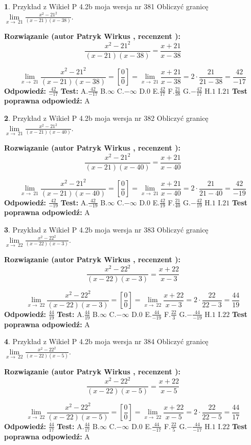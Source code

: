 \documentclass[12pt, a4paper]{article}
\theoremstyle{definition} %
\newtheorem{zad}{}
\newcommand{\zadStart}[1]{\begin{zad}#1\newline}
\newcommand{\zadStop}{\end{zad}}
\newcommand{\rozwStart}[2]{\noindent \textbf{Rozwiązanie (autor #1 , recenzent #2): }\newline}
\newcommand{\rozwStop}{\newline}
\newcommand{\odpStart}{\noindent \textbf{Odpowiedź:}\newline}
\newcommand{\odpStop}{\newline}
\newcommand{\testStart}{\noindent \textbf{Test:}\newline}
\newcommand{\testStop}{\newline}
\newcommand{\kluczStart}{\noindent \textbf{Test poprawna odpowiedź:}\newline}
\newcommand{\kluczStop}{\newline}
\begin{document}
\zadStart{Przykład z Wikieł P 4.2b moja wersja nr 381}
Obliczyć granicę $\lim\limits_{x\to\ 21}\frac{x^{2}-21^{2}}{(x-21)(x-38)}$.
\zadStop
\rozwStart{Patryk Wirkus}{}
$$\frac{x^{2}-21^{2}}{(x-21)(x-38)}=\frac{x+21}{x-38}$$

$$\lim\limits_{x\to\ 21}\frac{x^{2}-21^{2}}{(x-21)(x-38)}=[\frac{0}{0}]=\lim\limits_{x\to\ 21}\frac{x+21}{x-38}=2 \cdot \frac{21}{21-38} = \frac{42}{-17}$$
\rozwStop
\odpStart
$\frac{42}{-17}$
\odpStop
\testStart
A.$\frac{42}{-17}$
B.$\infty$
C.$-\infty$
D.$0$
E.$\frac{42}{17}$
F.$\frac{21}{38}$
G.$-\frac{42}{17}$
H.$1$
I.$21$
\testStop
\kluczStart
A
\kluczStop



\zadStart{Przykład z Wikieł P 4.2b moja wersja nr 382}
Obliczyć granicę $\lim\limits_{x\to\ 21}\frac{x^{2}-21^{2}}{(x-21)(x-40)}$.
\zadStop
\rozwStart{Patryk Wirkus}{}
$$\frac{x^{2}-21^{2}}{(x-21)(x-40)}=\frac{x+21}{x-40}$$

$$\lim\limits_{x\to\ 21}\frac{x^{2}-21^{2}}{(x-21)(x-40)}=[\frac{0}{0}]=\lim\limits_{x\to\ 21}\frac{x+21}{x-40}=2 \cdot \frac{21}{21-40} = \frac{42}{-19}$$
\rozwStop
\odpStart
$\frac{42}{-19}$
\odpStop
\testStart
A.$\frac{42}{-19}$
B.$\infty$
C.$-\infty$
D.$0$
E.$\frac{42}{19}$
F.$\frac{21}{40}$
G.$-\frac{42}{19}$
H.$1$
I.$21$
\testStop
\kluczStart
A
\kluczStop



\zadStart{Przykład z Wikieł P 4.2b moja wersja nr 383}
Obliczyć granicę $\lim\limits_{x\to\ 22}\frac{x^{2}-22^{2}}{(x-22)(x-3)}$.
\zadStop
\rozwStart{Patryk Wirkus}{}
$$\frac{x^{2}-22^{2}}{(x-22)(x-3)}=\frac{x+22}{x-3}$$

$$\lim\limits_{x\to\ 22}\frac{x^{2}-22^{2}}{(x-22)(x-3)}=[\frac{0}{0}]=\lim\limits_{x\to\ 22}\frac{x+22}{x-3}=2 \cdot \frac{22}{22-3} = \frac{44}{19}$$
\rozwStop
\odpStart
$\frac{44}{19}$
\odpStop
\testStart
A.$\frac{44}{19}$
B.$\infty$
C.$-\infty$
D.$0$
E.$\frac{44}{-19}$
F.$\frac{22}{3}$
G.$-\frac{44}{-19}$
H.$1$
I.$22$
\testStop
\kluczStart
A
\kluczStop



\zadStart{Przykład z Wikieł P 4.2b moja wersja nr 384}
Obliczyć granicę $\lim\limits_{x\to\ 22}\frac{x^{2}-22^{2}}{(x-22)(x-5)}$.
\zadStop
\rozwStart{Patryk Wirkus}{}
$$\frac{x^{2}-22^{2}}{(x-22)(x-5)}=\frac{x+22}{x-5}$$

$$\lim\limits_{x\to\ 22}\frac{x^{2}-22^{2}}{(x-22)(x-5)}=[\frac{0}{0}]=\lim\limits_{x\to\ 22}\frac{x+22}{x-5}=2 \cdot \frac{22}{22-5} = \frac{44}{17}$$
\rozwStop
\odpStart
$\frac{44}{17}$
\odpStop
\testStart
A.$\frac{44}{17}$
B.$\infty$
C.$-\infty$
D.$0$
E.$\frac{44}{-17}$
F.$\frac{22}{5}$
G.$-\frac{44}{-17}$
H.$1$
I.$22$
\testStop
\kluczStart
A
\kluczStop
\end{document}
